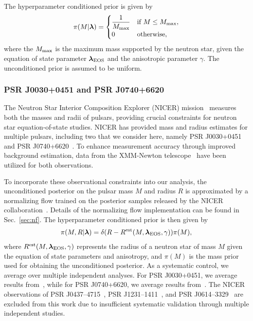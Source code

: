 \documentclass[prd,twocolumn,a4paper,floatfix,nofootinbib,preprintnumbers,superscriptaddress]{revtex4-1}
\begin{document}
The hyperparameter conditioned prior is given by
\begin{equation}
\pi(M | \boldsymbol{\lambda}) =
\begin{cases}
    \dfrac{1}{M_{\rm max}} & \text{if } M \leq M_{\rm max}, \\
    0 & \text{otherwise},
\end{cases}
\end{equation}
where the $M_{\rm max}$ is the maximum mass supported by the neutron star, given the equation of state parameter $\boldsymbol{\lambda}_{\rm EOS}$ and the anisotropic parameter $\gamma$. The unconditioned prior is assumed to be uniform.

\subsubsection{PSR J0030+0451 and PSR J0740+6620}
The Neutron Star Interior Composition Explorer (NICER) mission~\cite{2016SPIE.9905E..1HG} measures both the masses and radii of pulsars, providing crucial constraints for neutron star equation-of-state studies. NICER has provided mass and radius estimates for multiple pulsars, including two that we consider here, namely PSR J0030+0451~\cite{Miller:2019cac, Vinciguerra:2023qxq} and PSR J0740+6620~\cite{Dittmann:2024mbo, Salmi:2024aum}. To enhance measurement accuracy through improved background estimation, data from the XMM-Newton telescope~\cite{Struder:2001bh, Turner:2000jy} have been utilized for both observations.

To incorporate these observational constraints into our analysis, the unconditioned posterior on the pulsar mass $M$ and radius $R$ is approximated by a normalizing flow trained on the posterior samples released by the NICER collaboration~\cite{miller_2019_3473466, vinciguerra_2023_8239000, salmi_2024_10519473, dittmann_2024_10215109}. Details of the normalizing flow implementation can be found in Sec.~\ref{sec:nf}. The hyperparameter conditioned prior is then given by
\begin{equation}
    \pi(M, R | \boldsymbol{\lambda}) = \delta(R - R^{\rm est}(M, \boldsymbol{\lambda}_{\rm EOS}, \gamma))\pi(M),
\end{equation}
where $R^{\rm est}(M, \boldsymbol{\lambda}_{\rm EOS}, \gamma)$ represents the radius of a neutron star of mass $M$ given the equation of state parameters and anisotropy, and $\pi(M)$ is the mass prior used for obtaining the unconditioned posterior. As a systematic control, we average over multiple independent analyses. For PSR J0030+0451, we average results from~\cite{Miller:2019cac, Vinciguerra:2023qxq}, while for PSR J0740+6620, we average results from~\cite{Dittmann:2024mbo, Salmi:2024aum}. The NICER observations of PSR J0437--4715~\cite{Choudhury:2024xbk}, PSR J1231--1411~\cite{Salmi:2024bss}, and PSR J0614--3329~\cite{Mauviard:2025dmd} are excluded from this work due to insufficient systematic validation through multiple independent studies.
\end{document}
